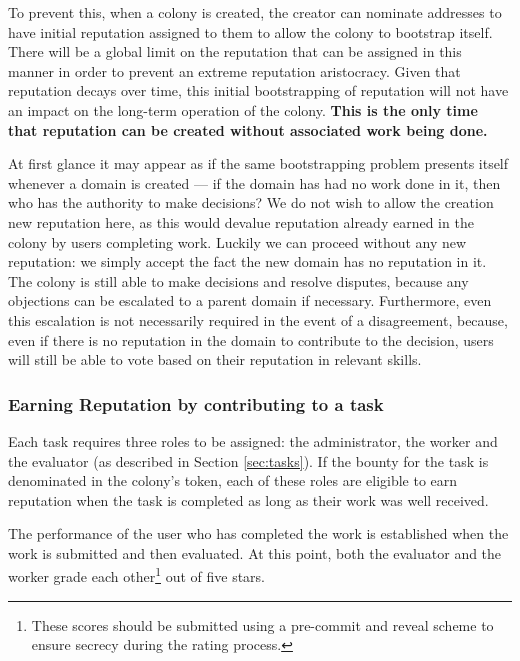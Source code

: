 To prevent this, when a colony is created, the creator can nominate addresses to have initial reputation assigned to them to allow the colony to bootstrap itself. There will be a global limit on the reputation that can be assigned in this manner in order to prevent an extreme reputation aristocracy. Given that reputation decays over time, this initial bootstrapping of reputation will not have an impact on the long-term operation of the colony. \textbf{This is the only time that reputation can be created without associated work being done.}

At first glance it may appear as if the same bootstrapping problem presents itself whenever a domain is created --- if the domain has had no work done in it, then who has the authority to make decisions? We do not wish to allow the creation new reputation here, as this would devalue reputation already earned in the colony by users completing work. Luckily we can proceed without any new reputation: we simply accept the fact the new domain has no reputation in it. The colony is still able to make decisions and resolve disputes, because any objections can be escalated to a parent domain if necessary. Furthermore, even this escalation is not necessarily required in the event of a disagreement, because, even if there is no reputation in the domain to contribute to the decision, users will still be able to vote based on their reputation in relevant skills.

\subsubsection{Earning Reputation by contributing to a task}\label{sec:earning-rep-from-task}
Each task requires three roles to be assigned: the administrator, the worker and the evaluator (as described in Section \ref{sec:tasks}). If the bounty for the task is denominated in the colony's token, each of these roles are eligible to earn reputation when the task is completed as long as their work was well received.

The performance of the user who has completed the work is established when the work is submitted and then evaluated. At this point, both the evaluator and the worker grade each other\footnote{These scores should be submitted using a pre-commit and reveal scheme to ensure secrecy during the rating process.} out of five stars.

